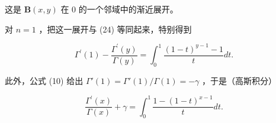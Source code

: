 这是 \(\mathbf{B}(x,y)\) 在 0 的一个邻域中的渐近展开。

对 \(n = 1\) ，把这一展开与 (24) 等同起来，特别得到

\[
\Gamma^ {\prime} (1) - \frac {\Gamma^ {\prime} (y)}{\Gamma (y)} = \int_ {0} ^ {1} \frac {(1 - t) ^ {y - 1} - 1}{t} d t.
\]

此外，公式 (10) 给出 \(\Gamma'(1) = \Gamma'(1)/\Gamma(1) = -\gamma\) ，于是（高斯积分）

\[
\frac {\Gamma^ {\prime} (x)}{\Gamma (x)} + \gamma = \int_ {0} ^ {1} \frac {1 - (1 - t) ^ {x - 1}}{t} d t.\tag{26}
\]

